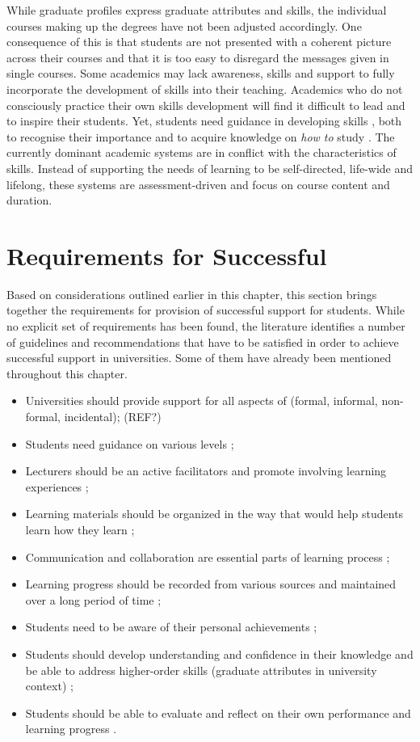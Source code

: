 While graduate profiles express graduate attributes and \LLLs skills, the
individual courses making up the degrees have not been adjusted accordingly. One
consequence of this is that students are not presented with a coherent picture
across their courses and that it is too easy to disregard the messages given in
single courses. Some academics may lack awareness, skills and support to fully
incorporate the development of \LLLs skills into their teaching. Academics who
do not consciously practice their own \LLLs skills development will find it
difficult to lead and to inspire their students. Yet, students need guidance in
developing \LLLs skills \citep{Leone2019}, both to recognise their importance
and to acquire knowledge on \textit{how to} study \citep{Medel-Anonuevo2001}. The
currently dominant academic systems are in conflict with the characteristics of
\LLLs skills. Instead of supporting the needs of learning to be self-directed,
life-wide and lifelong, these systems are assessment-driven and focus on course
content and duration.

\section{Requirements for Successful \LLLc}
\label{sec:needs}
Based on considerations outlined earlier in this chapter, this section brings
together the requirements for provision of successful \LLLs support for
students. While no explicit set of requirements has been found, the
literature identifies a number of guidelines and recommendations that have to be
satisfied in order to achieve successful \LLLs support in universities. Some of
them have already been mentioned throughout this chapter.
 
\begin{itemize}
  \item Universities should provide support for all aspects of \LLLs (formal,
  informal, non-formal, incidental); (REF?)
  \item Students need guidance on various levels \citep{Leone2019};
  \item Lecturers should be an active facilitators and promote involving
  learning experiences \citep{Leone2019}; 
  \item Learning materials should be organized in the way that would help
students learn how they learn \citep{Medel-Anonuevo2001};
  \item Communication and collaboration are essential parts of learning process
  \citep{Schaffert2008};
  \item Learning progress should be recorded from various sources and maintained
  over a long period of time \citep{Kay2008};
  \item Students need to be aware of their personal achievements
\citep{Schuetze2006};
  \item Students should develop understanding and confidence in their knowledge
  and be able to address higher-order skills (graduate attributes in university
  context) \citep{Hart1999};
  \item Students should be able to evaluate and reflect on their own performance
and learning progress \citep{Mourtos2003}.
\end{itemize} 

